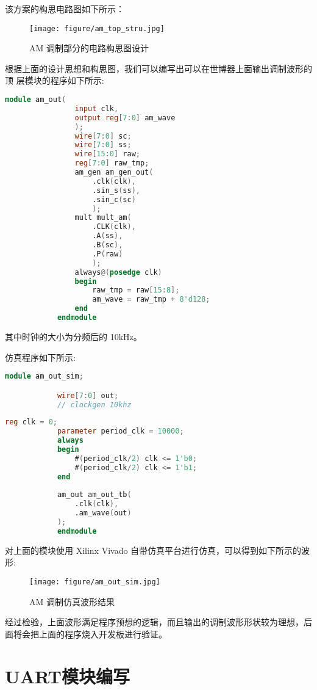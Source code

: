 {\begin{spacing}{1.5}
			该方案的构思电路图如下所示：
			\newline
			\begin{figure}[htbp]
				\centering
				\texttt{[image: figure/am\_top\_stru.jpg]}
				\caption{AM 调制部分的电路构思图设计}\label{fig:am_top_stru}
			\end{figure}

			根据上面的设计思想和构思图，我们可以编写出可以在世博器上面输出调制波形的顶 层模块的程序如下所示:
			\newpage
			\begin{lstlisting}[language=Verilog]
			module am_out(
				input clk,
				output reg[7:0] am_wave
				);
				wire[7:0] sc;
				wire[7:0] ss;
				wire[15:0] raw;
				reg[7:0] raw_tmp;
				am_gen am_gen_out(
					.clk(clk),
					.sin_s(ss),
					.sin_c(sc)
					);
				mult mult_am(
					.CLK(clk),
					.A(ss),
					.B(sc),
					.P(raw)
					);
				always@(posedge clk)
				begin
					raw_tmp = raw[15:8];
					am_wave = raw_tmp + 8'd128;
				end
			endmodule
			\end{lstlisting}

			其中时钟的大小为分频后的 10kHz。

			仿真程序如下所示:
			\begin{lstlisting}[language=Verilog]
			module am_out_sim;

			wire[7:0] out;
			// clockgen 10khz
			\end{lstlisting}
			\begin{lstlisting}[language=Verilog]
			reg clk = 0;
			parameter period_clk = 10000;
			always
			begin
				#(period_clk/2) clk <= 1'b0;
				#(period_clk/2) clk <= 1'b1;
			end
			
			am_out am_out_tb(
				.clk(clk),
				.am_wave(out)
			);
			endmodule
			\end{lstlisting}

			对上面的模块使用 Xilinx Vivado 自带仿真平台进行仿真，可以得到如下所示的波形:
			\newline
			\begin{figure}[htbp]
				\centering
				\texttt{[image: figure/am\_out\_sim.jpg]}
				\caption{AM 调制仿真波形结果}\label{fig:am_out_sim}
			\end{figure}

			经过检验，上面波形满足程序预想的逻辑，而且输出的调制波形形状较为理想，后面将会把上面的程序烧入开发板进行验证。

	\section{UART模块编写}

\end{spacing}}
